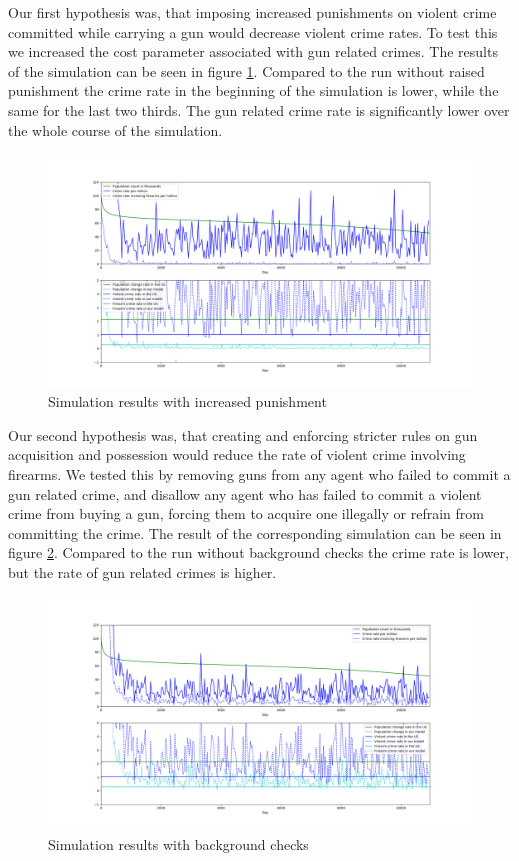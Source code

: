 \documentclass{JASSS}
\begin{document}
\par
Our first hypothesis was, that imposing increased punishments on violent crime committed while
carrying a gun would decrease violent crime rates. To test this we increased the cost parameter
associated with gun related crimes. The results of the simulation can be seen in figure
\ref{fig:hyp1}. Compared to the run without raised punishment the crime rate in the beginning
of the simulation is lower, while the same for the last two thirds. The gun related crime rate is
significantly lower over the whole course of the simulation.

\begin{figure}[!t]
\centering
\includegraphics[width=\textwidth]{long_1.png}
\caption{Simulation results with increased punishment}
\label{fig:hyp1}
\end{figure}

\par
Our second hypothesis was, that creating and enforcing stricter rules on gun acquisition and
possession would reduce the rate of violent crime involving firearms. We tested this by removing
guns from any agent who failed to commit a gun related crime, and disallow any agent who has failed
to commit a violent crime from buying a gun, forcing them to acquire one illegally or refrain from
committing the crime. The result of the corresponding simulation can be seen in figure
\ref{fig:hyp2}. Compared to the run without background checks the crime rate is lower, but the
rate of gun related crimes is higher.

\begin{figure}[!t]
\centering
\includegraphics[width=\textwidth]{long_2.png}
\caption{Simulation results with background checks}
\label{fig:hyp2}
\end{figure}
\end{document}
